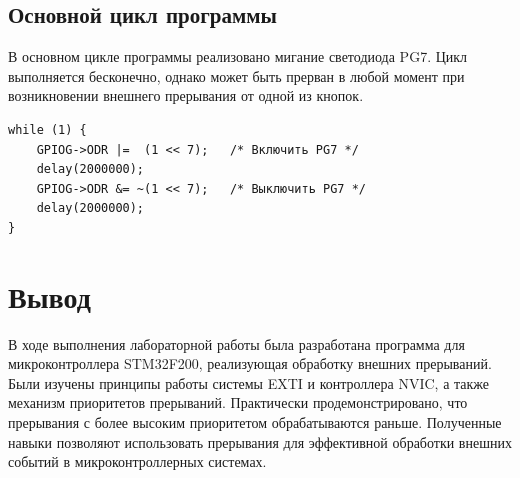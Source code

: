 \subsection{Основной цикл программы}

В основном цикле программы реализовано мигание светодиода PG7.
Цикл выполняется бесконечно, однако может быть прерван в любой момент при возникновении внешнего прерывания от одной из кнопок.

\begin{listing}[H]
\caption{Основной цикл программы}
\begin{verbatim}
while (1) {
    GPIOG->ODR |=  (1 << 7);   /* Включить PG7 */
    delay(2000000);
    GPIOG->ODR &= ~(1 << 7);   /* Выключить PG7 */
    delay(2000000);
}
\end{verbatim}
\end{listing}

\section{Вывод}

В ходе выполнения лабораторной работы была разработана программа для микроконтроллера STM32F200, реализующая обработку внешних прерываний.
Были изучены принципы работы системы EXTI и контроллера NVIC, а также механизм приоритетов прерываний.
Практически продемонстрировано, что прерывания с более высоким приоритетом обрабатываются раньше.
Полученные навыки позволяют использовать прерывания для эффективной обработки внешних событий в микроконтроллерных системах.

